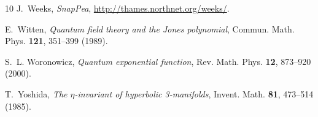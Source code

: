 \documentclass[12pt,reqno]{amsart}
\numberwithin{equation}{section}
\begin{document}
\begin{thebibliography}{10}
J.~Weeks, \emph{{SnapPea}}, \url{http://thames.northnet.org/weeks/}.

E.~Witten, \emph{Quantum field theory and the {Jones} polynomial}, Commun.
  Math. Phys. \textbf{121}, 351--399 (1989).

S.~L. Woronowicz, \emph{Quantum exponential function}, Rev. Math. Phys.
  \textbf{12}, 873--920 (2000).

T.~Yoshida, \emph{The $\eta$-invariant of hyperbolic 3-manifolds}, Invent.
  Math. \textbf{81}, 473--514 (1985).

\end{thebibliography}
\end{document}
